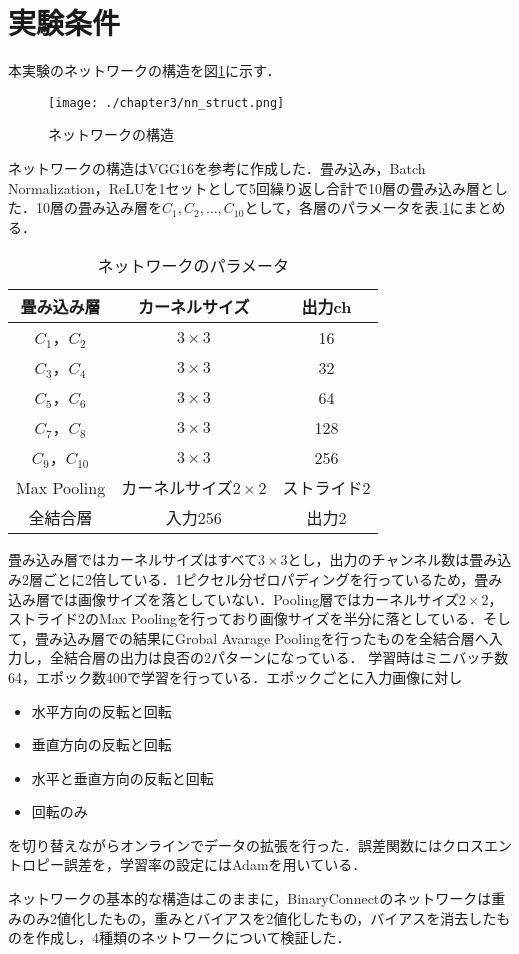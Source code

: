 \section{実験条件}
本実験のネットワークの構造を図\ref{fig_nnst}に示す．
\begin{figure}[]
  \begin{center}
    \texttt{[image: ./chapter3/nn\_struct.png]}
    \caption{ネットワークの構造}
    \label{fig_nnst}
  \end{center}
\end{figure}

ネットワークの構造はVGG16を参考に作成した．畳み込み，Batch Normalization，ReLUを1セットとして5回繰り返し合計で10層の畳み込み層とした．10層の畳み込み層を$C_1, C_2,  \ldots , C_{10}$として，各層のパラメータを表.\ref{table_network_parameter}にまとめる．
\begin{table}
  \caption{ネットワークのパラメータ}
  \label{table_network_parameter}
  \centering
  \begin{tabular}{ccc}
    \hline
    畳み込み層  & カーネルサイズ & 出力ch \\
    \hline \hline
    $C_1$，$C_2$ & $3\times 3$ & 16\\
    $C_3$，$C_4$ & $3\times 3$ & 32\\
    $C_5$，$C_6$ & $3\times 3$ & 64\\
    $C_7$，$C_8$ & $3\times 3$ & 128\\
    $C_9$，$C_{10}$ & $3\times 3$ & 256\\
    \hline
    Max Pooling & カーネルサイズ$2\times 2$ & ストライド2\\
    全結合層 & 入力256 & 出力2\\
    \hline
  \end{tabular}
\end{table}
畳み込み層ではカーネルサイズはすべて$3\times 3$とし，出力のチャンネル数は畳み込み2層ごとに2倍している．1ピクセル分ゼロパディングを行っているため，畳み込み層では画像サイズを落としていない．Pooling層ではカーネルサイズ$2\times 2$，ストライド2のMax Poolingを行っており画像サイズを半分に落としている．そして，畳み込み層での結果にGrobal Avarage Poolingを行ったものを全結合層へ入力し，全結合層の出力は良否の2パターンになっている．
学習時はミニバッチ数64，エポック数400で学習を行っている．エポックごとに入力画像に対し
\begin{itemize}
  \item 水平方向の反転と回転
  \item 垂直方向の反転と回転
  \item 水平と垂直方向の反転と回転
  \item 回転のみ
\end{itemize}
を切り替えながらオンラインでデータの拡張を行った．誤差関数にはクロスエントロピー誤差を，学習率の設定にはAdamを用いている．

ネットワークの基本的な構造はこのままに，BinaryConnectのネットワークは重みのみ2値化したもの，重みとバイアスを2値化したもの，バイアスを消去したものを作成し，4種類のネットワークについて検証した．